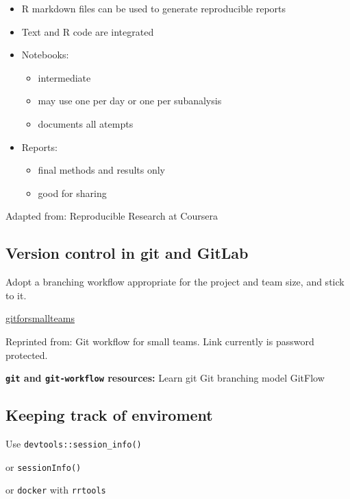 \documentclass[]{book}
\providecommand{\tightlist}{%
  \setlength{\itemsep}{0pt}\setlength{\parskip}{0pt}}
\begin{document}
\begin{itemize}
\item
  R markdown files can be used to generate reproducible reports
\item
  Text and R code are integrated
\item
  Notebooks:

  \begin{itemize}
  \tightlist
  \item
    intermediate
  \item
    may use one per day or one per subanalysis
  \item
    documents all atempts
  \end{itemize}
\item
  Reports:

  \begin{itemize}
  \tightlist
  \item
    final methods and results only
  \item
    good for sharing
  \end{itemize}
\end{itemize}

Adapted from: Reproducible Research at Coursera

\hypertarget{version-control-in-git-and-gitlab}{%
\subsection{Version control in git and GitLab}\label{version-control-in-git-and-gitlab}}

Adopt a branching workflow appropriate for the project and team size, and stick to it.

\url{gitforsmallteams}

Reprinted from: Git workflow for small teams. Link currently is password protected.

\textbf{\texttt{git} and \texttt{git-workflow} resources:}
Learn git
Git branching model
GitFlow

\hypertarget{keeping-track-of-enviroment}{%
\subsection{Keeping track of enviroment}\label{keeping-track-of-enviroment}}

Use \texttt{devtools::session\_info()}

or \texttt{sessionInfo()}

or \texttt{docker} with \texttt{rrtools}
\end{document}

